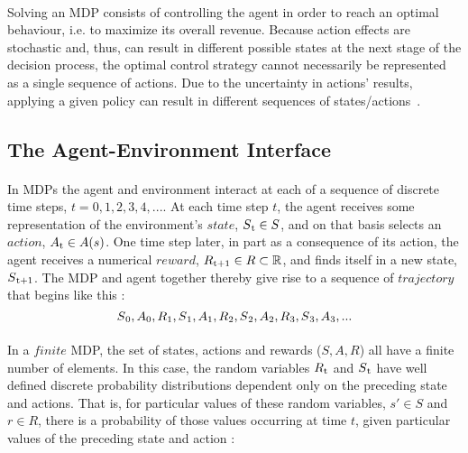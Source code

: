 \paragraph{} Solving an MDP consists
of controlling the agent in order to reach an optimal behaviour, i.e. to maximize its overall revenue. Because action effects are stochastic and, thus, can result in different possible states at the next stage of the decision process, the optimal control strategy cannot necessarily be represented as a single sequence of actions. Due to the uncertainty in actions’ results, applying a given policy can result in different sequences of states/actions~\cite{Sigaud:2010:MDP:1841781}.


\subsection{The Agent-Environment Interface}
\paragraph{} In MDPs the agent and environment interact at each of a sequence of discrete time steps, $t = 0, 1, 2, 3, 4, ...$. At each time step $t$, the agent receives some representation of the environment's $state$, $S\textsubscript{t} \in S$, and on that basis selects an $action$, $A\textsubscript{t} \in A(s)$. One time step later, in part as a consequence of its action, the agent receives a numerical $reward$, $R\textsubscript{t+1} \in R \subset \mathbb{R}$, and finds itself in a new state, $S\textsubscript{t+1}$. The MDP and agent together thereby give rise to a sequence of $trajectory$ that begins like this :
\begin{equation}
S\textsubscript{0}, A\textsubscript{0}, R\textsubscript{1}, S\textsubscript{1}, A\textsubscript{1}, R\textsubscript{2}, S\textsubscript{2}, A\textsubscript{2}, R\textsubscript{3}, S\textsubscript{3}, A\textsubscript{3}, ...
\end{equation}

\paragraph{} In a $finite$ MDP, the set of states, actions and rewards ($S, A, R$) all have a finite number of elements. In this case, the random variables $R\textsubscript{t}$ and $S\textsubscript{t}$ have well defined discrete probability distributions dependent only on the preceding state and actions. That is, for particular values of these random variables, $s' \in S$ and $r \in R$, there is a probability of those values occurring at time $t$, given particular values of the preceding state and action : 

